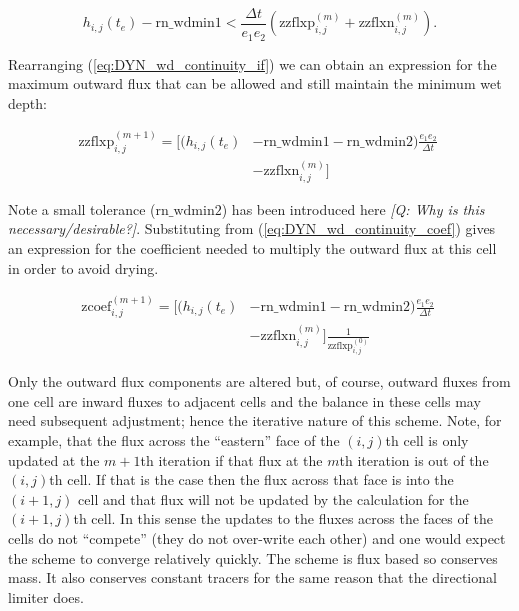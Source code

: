 \documentclass[../main/NEMO_manual]{subfiles}
\begin{document}
\begin{equation}
  \label{eq:DYN_wd_continuity_if}
  h_{i,j}(t_e)  - \mathrm{rn\_wdmin1} <  \frac{\Delta t}{e_1 e_2} ( \mathrm{zzflxp}^{(m)}_{i,j} + \mathrm{zzflxn}^{(m)}_{i,j} ) .
\end{equation}

Rearranging (\autoref{eq:DYN_wd_continuity_if}) we can obtain an expression for the maximum
outward flux that can be allowed and still maintain the minimum wet depth:

\begin{equation}
  \label{eq:DYN_wd_max_flux}
  \begin{split}
    \mathrm{zzflxp}^{(m+1)}_{i,j} = \Big[ (h_{i,j}(t_e) & - \mathrm{rn\_wdmin1} - \mathrm{rn\_wdmin2})  \frac{e_1 e_2}{\Delta t} \phantom{]} \\
    \phantom{[} & -  \mathrm{zzflxn}^{(m)}_{i,j} \Big]
  \end{split}
\end{equation}

Note a small tolerance ($\mathrm{rn\_wdmin2}$) has been introduced here {\itshape [Q: Why is
this necessary/desirable?]}. Substituting from (\autoref{eq:DYN_wd_continuity_coef}) gives an
expression for the coefficient needed to multiply the outward flux at this cell in order
to avoid drying.

\begin{equation}
  \label{eq:DYN_wd_continuity_nxtcoef}
  \begin{split}
    \mathrm{zcoef}^{(m+1)}_{i,j} = \Big[ (h_{i,j}(t_e) & - \mathrm{rn\_wdmin1} - \mathrm{rn\_wdmin2})  \frac{e_1 e_2}{\Delta t} \phantom{]} \\
    \phantom{[} & -  \mathrm{zzflxn}^{(m)}_{i,j} \Big] \frac{1}{ \mathrm{zzflxp}^{(0)}_{i,j} }
  \end{split}
\end{equation}

Only the outward flux components are altered but, of course, outward fluxes from one cell
are inward fluxes to adjacent cells and the balance in these cells may need subsequent
adjustment; hence the iterative nature of this scheme.  Note, for example, that the flux
across the ``eastern'' face of the $(i,j)$th cell is only updated at the $m+1$th iteration
if that flux at the $m$th iteration is out of the $(i,j)$th cell. If that is the case then
the flux across that face is into the $(i+1,j)$ cell and that flux will not be updated by
the calculation for the $(i+1,j)$th cell. In this sense the updates to the fluxes across
the faces of the cells do not ``compete'' (they do not over-write each other) and one
would expect the scheme to converge relatively quickly. The scheme is flux based so
conserves mass. It also conserves constant tracers for the same reason that the
directional limiter does.
\end{document}
